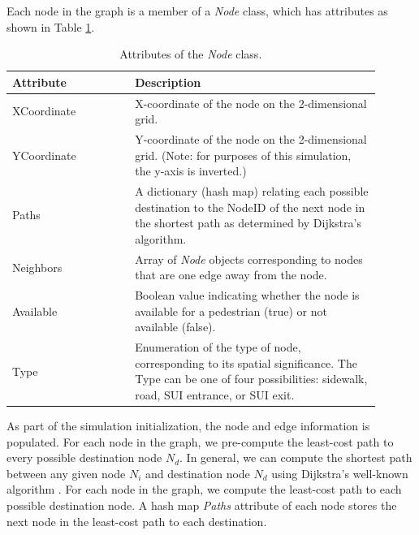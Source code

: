 \documentclass[12pt]{article}
\begin{document}
Each node in the graph is a member of a \textit{Node} class, which
has attributes as shown in Table \ref{table:node}.

\def\arraystretch{1.5}
\begin{table}[hb!]
  \centering
    \begin{tabular}{p{0.3\linewidth}p{0.6\linewidth}}
     \hline
     Attribute & Description \\
     \hline
     XCoordinate & X-coordinate of the node on the 2-dimensional grid. \\
     YCoordinate & Y-coordinate of the node on the 2-dimensional grid.
                   (Note: for purposes of this simulation, the y-axis is
                    inverted.) \\
     Paths       & A dictionary (hash map) relating each possible destination
                   to the NodeID of the next node in the shortest path as
                   determined by Dijkstra's algorithm. \\
     Neighbors & Array of \textit{Node} objects corresponding to nodes that are
                 one edge away from the node. \\
     Available	& Boolean value indicating whether the node is available for a
                  pedestrian (true) or not available (false). \\
     Type      & Enumeration of the type of node, corresponding to its spatial
                 significance. The Type can be one of four possibilities:
                 sidewalk, road, SUI entrance, or SUI exit. \\
     \hline
    \end{tabular}
    \caption{Attributes of the \textit{Node} class.}
  \label{table:node}
\end{table}

As part of the simulation initialization, the node and edge information is
populated. For each node in the graph, we pre-compute the least-cost path to
every possible destination node $N_d$. In general, we can compute the shortest
path between any given node $N_i$ and destination node $N_d$ using Dijkstra's
well-known algorithm \cite{dijkstra1959note}. For each node in the graph, we
compute the least-cost path to each possible destination node. A hash map
\textit{Paths} attribute of each node stores the next node in the least-cost
path to each destination.

\end{document}
